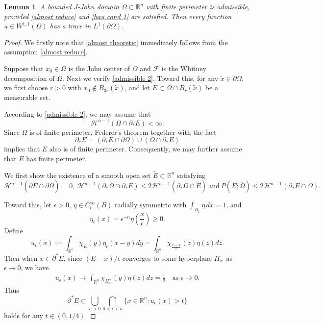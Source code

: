 \documentclass[reqno,11pt]{amsart}
\makeatletter
\def\ez{\epsilon}
\newtheorem{lem}[thm]{Lemma}%
\numberwithin{equation}{section}
\theoremstyle{remark}
\makeatother
\begin{document}
 \begin{lem}\label{admissible proof}
     A bounded $J$-John domain $\Omega\subset\mathbb R^n$ with finite perimeter is admissible, provided \eqref{almost reduce} and \eqref{hau cond 1} are satisfied. Then every function $u\in W^{1,1}(\Omega)$ has a trace in  $L^1(\partial \Omega)$.
 \end{lem}
\begin{proof} 
We firstly note that \eqref{almost theoretic} immediately follows from the assumption \eqref{almost reduce}. 


Suppose that $x_0\in \Omega$ is the John center of $\Omega$ and $\mathscr{F}$ is the Whitney decomposition of $\Omega$. 
Next we verify \eqref{admissible 2}. Toward this,  
for any $\widetilde x\in \partial \Omega$, we first choose  $r>0$ with $x_0\notin B_{3r}(\widetilde x)$, and let $E\subset\overline{\Omega}\cap B_r(\widetilde x)$ be a measurable set.  


According to \eqref{admissible 2}, we may assume that 
$$\mathcal H^{n-1}(\Omega\cap \partial_* E)<\infty.$$
Since  $\Omega$ is of finite perimeter, Federer's theorem \cite[Theorem 16.2]{M2012} together with the fact
$$\partial_*E = (\partial_* E \cap \partial \Omega)\cup (\Omega\cap \partial_* E) $$
implies that $E$ also is of finite perimeter.
Consequently,  we may further assume that $E$ has finite perimeter. 

\medskip
{} We first show the existence of   a smooth open set $\widetilde E\subset \mathbb R^n$ satisfying 
\begin{equation}\label{replace}
    \mathcal H^{n-1}(\partial \widetilde E\cap \partial \Omega)=0,\  \mathcal{H}^{n-1}(\partial_*\Omega\cap \partial_*E)\le 2\mathcal{H}^{n-1}(\partial_*\Omega\cap \widetilde E)\ \text{and}\  P(\widetilde E;\overline{\Omega})\le 2\mathcal{H}^{n-1}(\partial_*E\cap \Omega).
\end{equation}


Toward this, let $\ez>0$, $\eta\in C^\infty_c(B)$ radially symmetric with $\int_{B_1} \eta\, dx=1$, and 
$$\eta_\ez(x)=\ez^{-n}\eta\left(\frac x \ez\right)\ge 0.$$
Define
$$u_{\epsilon}(x):=\int_{\mathbb R^n}\chi_E(y)\eta_\epsilon(x-y)dy =\int_{\mathbb R^n}\chi_{\frac{E-x}{\epsilon}}(z)\eta(z)dz.$$
Then when $x\in \partial^*E$, since $(E-x)/\epsilon$ converges to some hyperplane $H_x^-$ as $\epsilon\to 0$, we have 
\begin{align*}
    u_{\epsilon}(x)\to \int_{\mathbb R^n}\chi_{H_x^-}(y)\eta(z)dz=\frac{1}{2}\quad \text{as } \epsilon\to 0.
\end{align*}
Thus
\begin{equation}\label{open inclu}
    \partial^*E\subset \bigcup_{a>0}\bigcap_{0<\epsilon<a}\{x\in \mathbb R^n: u_{\epsilon}(x)>t\}
\end{equation}
holds for any $t\in (0,1/4)$. 


\end{proof}
\end{document}
